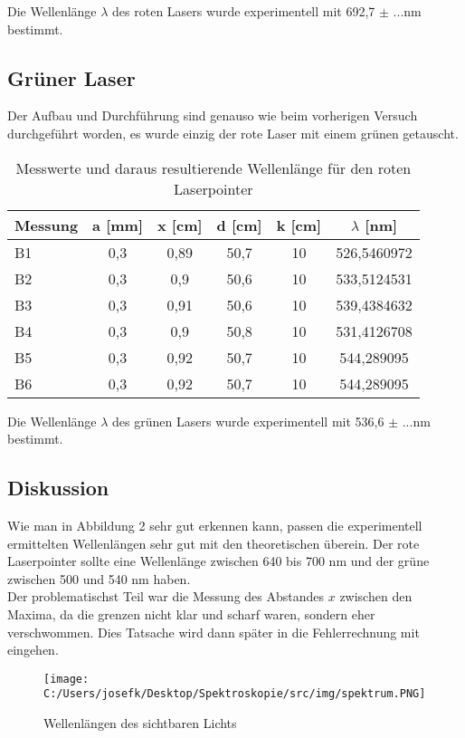 Die Wellenlänge $\lambda$ des roten Lasers wurde experimentell mit 692,7 $\pm$ ...nm bestimmt.

\subsection{Grüner Laser}

Der Aufbau und Durchführung sind genauso wie beim vorherigen Versuch durchgeführt worden, es wurde einzig der rote Laser mit einem grünen getauscht.

\begin{table}[H]
	\centering
	\begin{tabular}{lccccc}
		\toprule
		Messung & a [mm] & x [cm] & d [cm] & k [cm] & $\lambda$ [nm] \\
		\midrule
		B1      & 0,3    & 0,89   & 50,7   & 10     & 526,5460972    \\
		B2      & 0,3    & 0,9    & 50,6   & 10     & 533,5124531    \\
		B3      & 0,3    & 0,91   & 50,6   & 10     & 539,4384632    \\
		B4      & 0,3    & 0,9    & 50,8   & 10     & 531,4126708    \\
		B5      & 0,3    & 0,92   & 50,7   & 10     & 544,289095     \\
		B6      & 0,3    & 0,92   & 50,7   & 10     & 544,289095     \\
		\bottomrule
	\end{tabular}
	\caption{Messwerte und daraus resultierende Wellenlänge für den roten Laserpointer}
\end{table}

Die Wellenlänge $\lambda$ des grünen Lasers wurde experimentell mit 536,6 $\pm$ ...nm bestimmt.

\subsection{Diskussion}
Wie man in Abbildung 2 sehr gut erkennen kann, passen die experimentell ermittelten Wellenlängen sehr gut mit den theoretischen überein.
Der rote Laserpointer sollte eine Wellenlänge zwischen 640 bis 700 nm und der grüne zwischen 500 und 540 nm haben.\\
Der problematischst Teil war die Messung des Abstandes $x$ zwischen den Maxima, da die grenzen nicht klar und scharf waren, sondern eher verschwommen. Dies Tatsache wird dann später in die 
Fehlerrechnung mit eingehen.   
\begin{figure}[H]
    \centering
	\texttt{[image: C:/Users/josefk/Desktop/Spektroskopie/src/img/spektrum.PNG]}
	\caption{Wellenlängen des sichtbaren Lichts}
\end{figure}
